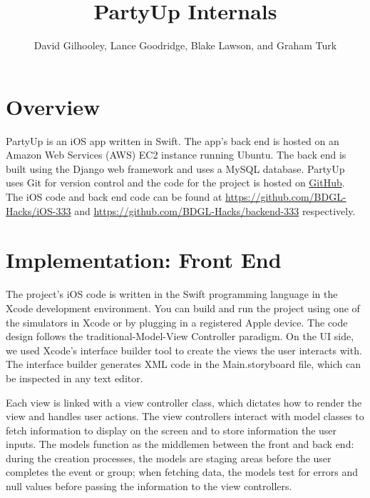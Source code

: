 \documentclass[12pt]{article}
\title{PartyUp Internals}
\author{David Gilhooley, Lance Goodridge, Blake Lawson, and Graham Turk}
\begin{document}
\pagestyle{plain}

\maketitle

\section{Overview}

PartyUp is an iOS app written in Swift.
The app's back end is hosted on an Amazon Web Services (AWS)
EC2 instance running Ubuntu.
The back end is built using the Django web framework and uses
a MySQL database.
PartyUp uses Git for version control and the code for the project is 
hosted on \href{https://github.com/}{GitHub}.
The iOS code and back end code can be found at 
\url{https://github.com/BDGL-Hacks/iOS-333} and
\url{https://github.com/BDGL-Hacks/backend-333} respectively.


\section{Implementation: Front End}

The project's iOS code is written in the Swift programming language in the Xcode development environment. You can build and run the project using one of the simulators in Xcode or by plugging in a registered Apple device. The code design follows the traditional-Model-View Controller paradigm. On the UI side, we used Xcode's interface builder tool to create the views the user interacts with. The interface builder generates XML code in the Main.storyboard file, which can be inspected in any text editor.

\bigskip

Each view is linked with a view controller class, which dictates how to render the view and handles user actions. The view controllers interact with model classes to fetch information to display on the screen and to store information the user inputs. The models function as the middlemen between the front and back end: during the creation processes, the models are staging areas before the user completes the event or group; when fetching data, the models test for errors and null values before passing the information to the view controllers.

\bigskip
\end{document}
